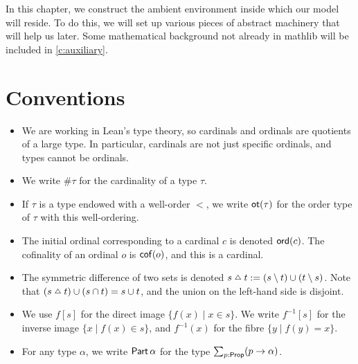 In this chapter, we construct the ambient environment inside which our model will reside.
To do this, we will set up various pieces of abstract machinery that will help us later.
Some mathematical background not already in mathlib will be included in \cref{c:auxiliary}.

\section{Conventions}
\begin{itemize}
  \item We are working in Lean's type theory, so cardinals and ordinals are quotients of a large type.
  In particular, cardinals are not just specific ordinals, and types cannot be ordinals.
  \item We write \( \#\tau \) for the cardinality of a type \( \tau \).
  \item If \( \tau \) is a type endowed with a well-order \( < \), we write \( \operatorname{\mathsf{ot}}(\tau) \) for the order type of \( \tau \) with this well-ordering.
  \item The initial ordinal corresponding to a cardinal \( c \) is denoted \( \operatorname{\mathsf{ord}}(c) \).
  The cofinality of an ordinal \( o \) is \( \operatorname{\mathsf{cof}}(o) \), and this is a cardinal.
  \item The symmetric difference of two sets is denoted \( s \symmdiff t \coloneq (s \setminus t) \cup (t \setminus s) \).
  Note that \( (s \symmdiff t) \cup (s \cap t) = s \cup t \), and the union on the left-hand side is disjoint.
  \item We use \( f[s] \) for the direct image \( \{ f(x) \mid x \in s \} \). We write \( f^{-1}[s] \) for the inverse image \( \{ x \mid f(x) \in s \} \), and \( f^{-1}(x) \) for the fibre \( \{ y \mid f(y) = x \} \).
  \item For any type \( \alpha \), we write \( \operatorname{\mathsf{Part}} \alpha \) for the type \( \sum_{p : \mathsf{Prop}} (p \to \alpha) \).
\end{itemize}

